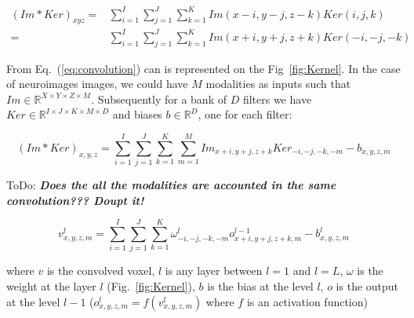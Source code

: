 \documentclass[final, paper=letter,5p,times,twocolumn]{elsarticle}
\newcommand{\ToDo}[1]{ToDo: \textbf{\textit{#1}}}
\begin{document}
\begin{equation*}
  \begin{split}
    (Im*Ker)_{xyz} = & \sum_{i=1}^{I}\sum_{j=1}^{J}\sum_{k=1}^{K}Im(x-i,y-j,z-k)Ker(i,j,k)\\
    = & \sum_{i=1}^{I}\sum_{j=1}^{J}\sum_{k=1}^{K}Im(x+i,y+j,z+k)Ker(-i,-j,-k)
  \end{split}
  \label{eq:convolution} 
\end{equation*}

From Eq.~(\ref{eq:convolution}) can is represented on the Fig~\ref{fig:Kernel}. In the case of neuroimages images, we could have $M$ modalities as inputs such that $Im \in \mathbb{R}^{X \times Y \times Z \times M}$. Subsequently for a bank of $D$ filters we have $Ker \in \mathbb{R}^{I \times J \times K \times M \times D}$ and biases $b \in \mathbb{R}^{D}$, one for each filter:

\begin{equation*}
    (Im*Ker)_{x,y,z} =  \sum_{i=1}^{I}\sum_{j=1}^{J}\sum_{k=1}^{K}\sum_{m=1}^{M}Im_{x+i,y+j,z+k}Ker_{-i,-j,-k,-m} - b_{x,y,z,m}
  \label{eq:convolution_tot} 
\end{equation*}

\ToDo{Does the all the modalities are accounted in the same convolution??? Doupt it!}

\begin{equation}
    v_{x,y,z,m}^{l} =  \sum_{i=1}^{I}\sum_{j=1}^{J}\sum_{k=1}^{K}\omega_{-i,-j,-k,-m}^{l}o_{x+i,y+j,z+k,m}^{l-1} - b_{x,y,z,m}^{l}
  \label{eq:convolution_tot_vox} 
\end{equation}

where $v$ is the convolved voxel, $l$ is any layer between $l = 1$ and $l = L$, $\omega$ is the weight at the layer $l$ (Fig.~\ref{fig:Kernel}), $b$ is the bias at the level $l$, $o$ is the output at the level $l-1$ ($o_{x,y,z,m}^{l} = f(v_{x,y,z,m}^{l})$ where $f$ is an activation function)
\end{document}
